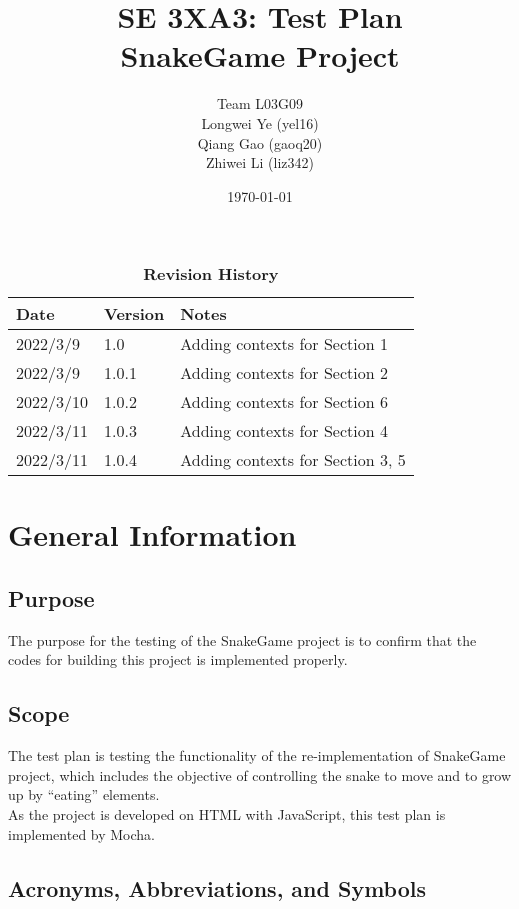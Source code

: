 \documentclass[12pt, titlepage]{article}
\title{SE 3XA3: Test Plan\\SnakeGame Project}
\author{Team L03G09
		\\ Longwei Ye (yel16)
		\\ Qiang Gao (gaoq20)
		\\ Zhiwei Li (liz342)
}
\date{\today}
\begin{document}
\maketitle

\tableofcontents
\listoftables
\listoffigures

\begin{table}[bp]
\caption{\bf Revision History}
\begin{tabularx}{\textwidth}{p{3cm}p{2cm}X}
\toprule {\bf Date} & {\bf Version} & {\bf Notes}\\
\midrule
2022/3/9 & 1.0 & Adding contexts for Section 1\\
2022/3/9 & 1.0.1 & Adding contexts for Section 2\\
2022/3/10 & 1.0.2 & Adding contexts for Section 6\\
2022/3/11 & 1.0.3 & Adding contexts for Section 4\\
2022/3/11 & 1.0.4 & Adding contexts for Section 3, 5\\
\bottomrule
\end{tabularx}
\end{table}

\newpage


\section{General Information}

\subsection{Purpose}
The purpose for the testing of the SnakeGame project is to confirm that the codes for building this project is implemented properly.

\subsection{Scope}
The test plan is testing the functionality of the re-implementation of SnakeGame project, which includes the objective of controlling the snake to move and to grow up by ``eating'' elements.\\

\noindent As the project is developed on HTML with JavaScript, this test plan is implemented by Mocha.

\subsection{Acronyms, Abbreviations, and Symbols}
	
\end{document}
